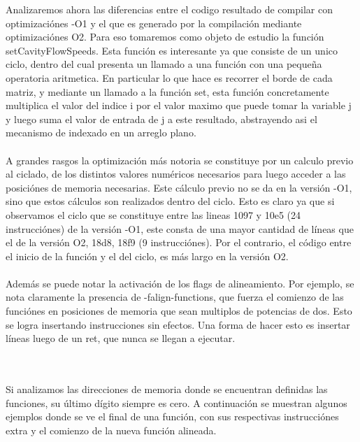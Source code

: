 Analizaremos ahora las diferencias entre el codigo resultado de compilar con optimizaciónes -O1 y el que es generado por la compilación mediante optimizaciónes O2. Para eso tomaremos como objeto de estudio la función setCavityFlowSpeeds. Esta función es interesante ya que consiste de un unico ciclo, dentro del cual presenta un llamado a una función con una pequeña operatoria aritmetica. En particular lo que hace es recorrer el borde de cada matriz, y mediante un llamado a la función set, esta función concretamente multiplica el valor del indice i por el valor maximo que puede tomar la variable j y luego suma el valor de entrada de j a este resultado, abstrayendo asi el mecanismo de indexado en un arreglo plano.  
~\\
~\\
A grandes rasgos la optimización más notoria se constituye por un calculo previo al ciclado, de los distintos valores numéricos necesarios para luego acceder a las posiciónes de memoria necesarias. Este cálculo previo no se da en la versión -O1, sino que estos cálculos son realizados dentro del ciclo. Esto es claro ya que si observamos el ciclo que se constituye entre las lineas 1097 y 10e5 (24 instrucciónes) de la versión -O1, este consta de una mayor cantidad de líneas que el de la versión O2, 18d8, 18f9 (9 instrucciónes). Por el contrario, el código entre el inicio de la función y el del ciclo, es más largo en la versión O2. 
~\\
~\\


Además se puede notar la activación de los flags de alineamiento. Por ejemplo, se nota claramente la presencia de -falign-functions, que fuerza el comienzo de las funciónes en posiciones de memoria que sean multiplos de potencias de dos. Esto se logra insertando instrucciones sin efectos. Una forma de hacer esto es insertar líneas luego de un ret, que nunca se llegan a ejecutar. 

~\\
~\\

Si analizamos las direcciones de memoria donde se encuentran definidas las funciones, su último dígito siempre es cero. A continuación se muestran algunos ejemplos donde se ve el final de una función, con sus respectivas instrucciónes extra y el comienzo de la nueva función alineada.

